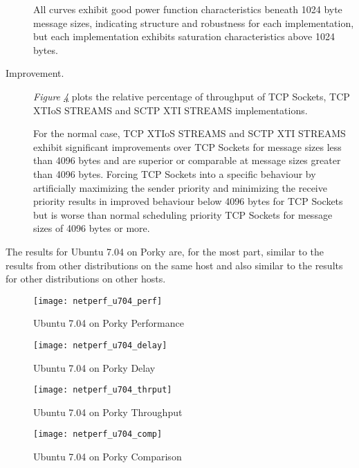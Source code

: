\documentclass[letterpaper,final,notitlepage,twocolumn,10pt,twoside]{article}
\begin{document}
\begin{description}
All curves exhibit good power function characteristics beneath 1024 byte message sizes, indicating
structure and robustness for each implementation, but each implementation exhibits saturation
characteristics above 1024 bytes.

\item[Improvement.]

\textit{Figure \ref{figure:u704comp}}
plots the relative percentage of throughput of TCP Sockets, TCP XTIoS STREAMS and SCTP XTI STREAMS
implementations.

For the normal case, TCP XTIoS STREAMS and SCTP XTI STREAMS exhibit significant improvements over
TCP Sockets for message sizes less than 4096 bytes and are superior or comparable  at message sizes
greater than 4096 bytes.  Forcing TCP Sockets into a specific behaviour by artificially maximizing
the sender priority and minimizing the receive priority results in improved behaviour below 4096
bytes for TCP Sockets but is worse than normal scheduling priority TCP Sockets for message sizes of
4096 bytes or more.

\end{description}

The results for Ubuntu 7.04 on Porky are, for the most part, similar to the results from other
distributions on the same host and also similar to the results for other distributions on other
hosts.

\begin{figure}[p]
\center\texttt{[image: netperf\_u704\_perf]}
\caption[Ubuntu 7.04 on Porky Performance]{Ubuntu 7.04 on Porky Performance}
\label{figure:u704perf}
\end{figure}

\begin{figure}[p]
\center\texttt{[image: netperf\_u704\_delay]}
\caption[Ubuntu 7.04 on Porky Delay]{Ubuntu 7.04 on Porky Delay}
\label{figure:u704dly}
\end{figure}

\begin{figure}[p]
\center\texttt{[image: netperf\_u704\_thrput]}
\caption[Ubuntu 7.04 on Porky Throughput]{Ubuntu 7.04 on Porky Throughput}
\label{figure:u704thrput}
\end{figure}

\begin{figure}[pt]
\center\texttt{[image: netperf\_u704\_comp]}
\caption[Ubuntu 7.04 on Porky Comparison]{Ubuntu 7.04 on Porky Comparison}
\label{figure:u704comp}
\end{figure}
\end{document}
